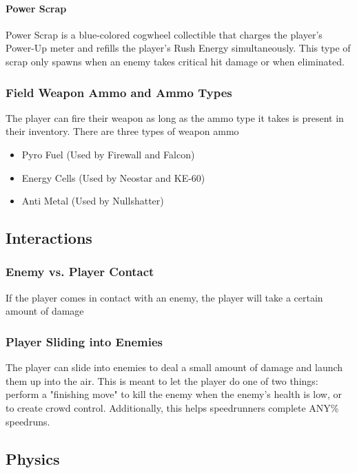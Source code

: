 \documentclass[12pt]{article}
\begin{document}
\paragraph{Power Scrap}

Power Scrap is a blue-colored cogwheel collectible that charges the player's Power-Up meter and refills the player's Rush Energy simultaneously. This type of scrap only spawns when an enemy takes critical hit damage or when eliminated.

\subsubsection{Field Weapon Ammo and Ammo Types}

The player can fire their weapon as long as the ammo type it takes is present in their inventory. There are three types of weapon ammo

\begin{itemize}
	\item Pyro Fuel (Used by Firewall and Falcon)
	\item Energy Cells (Used by Neostar and KE-60)
	\item Anti Metal (Used by Nullshatter)
\end{itemize}

\subsection{Interactions}

\subsubsection{Enemy vs. Player Contact}

If the player comes in contact with an enemy, the player will take a certain amount of damage

\subsubsection{Player Sliding into Enemies}

The player can slide into enemies to deal a small amount of damage and launch them up into the air. This is meant to let the player do one of two things: perform a "finishing move" to kill the enemy when the enemy's health is low, or to create crowd control. Additionally, this helps speedrunners complete ANY\% speedruns. 

\subsection{Physics}
\end{document}
